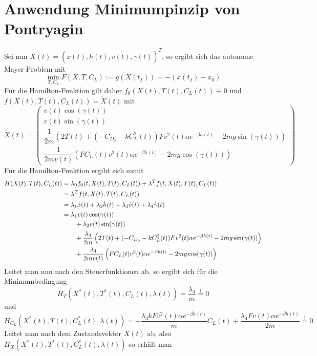 \section{Anwendung Minimumpinzip von Pontryagin}
Sei nun $\dot{X}(t) = (\dot{x}(t), \dot{h}(t),\dot{v}(t),\dot{\gamma}(t))^T$, so ergibt sich das autonome Mayer-Problem mit \[\min_{T,C_L} F(X,T,C_L) := g(X(t_f)) =  -(x(t_f) - x_0)\] Für die Hamilton-Funktion gilt daher $f_0(X(t),T(t),C_L(t)) \equiv 0$ und $f(X(t),T(t),C_L(t)) = \dot{X}(t)$ mit
\[\dot{X}(t) = \begin{pmatrix}
v(t) \cos(\gamma(t)) \\ 
v(t) \sin(\gamma(t)) \\ 
\dfrac{1}{2m} \left(2T(t) + (-C_{D_0}-k C_L^2(t)) F  v^2(t) \alpha e^{-\beta h(t)} - 2 m g \sin(\gamma(t)) \right) \\ 
\dfrac{1}{2mv(t)} \left(F C_L(t)v^2(t) \alpha e^{-\beta h(t)} - 2 m g \cos(\gamma(t)) \right)
\end{pmatrix} \]
Für die Hamilton-Funktion ergibt sich somit 
\[\begin{split}
H(X(t),T(t),C_L(t)) &= \lambda_0 f_0(t,X(t),T(t),C_L(t)) + \lambda^T f(t,X(t),T(t),C_L(t)) \\\
&= \lambda^T f(t,X(t),T(t),C_L(t)) \\\
&= \lambda_1 \dot{x}(t) + \lambda_2 \dot{h}(t) + \lambda_3 \dot{v}(t) + \lambda_4 \dot{\gamma}(t) \\\
&= \lambda_1 v(t) \cos(\gamma(t)) \\\
&\hspace{7mm} + \lambda_2 v(t) \sin(\gamma(t)) \\\
&\hspace{7mm} + \dfrac{\lambda_3}{2m} \left(2T(t) + (-C_{D_0}-k C_L^2(t)) F  v^2(t) \alpha e^{-\beta h(t)} - 2 m g \sin(\gamma(t)) \right) \\\
&\hspace{7mm} + \dfrac{\lambda_4}{2mv(t)} \left(F C_L(t)v^2(t) \alpha e^{-\beta h(t)} - 2 m g \cos(\gamma(t)) \right) 
\end{split}\]
Leitet man nun nach den Steuerfunktionen ab, so ergibt sich für die Minimumbedingung
\[H_{T}(X^{\ast}(t),T^{\ast}(t),C_L(t),\lambda(t)) = \dfrac{\lambda_3}{m} \stackrel{!}{=} 0\]
und 
\[H_{C_L}(X^{\ast}(t),T(t),C_L^{\ast}(t),\lambda(t)) = - \dfrac{\lambda_3 k F v^2(t) \alpha e^{-\beta h(t)}}{m} C_L(t)  + \dfrac{\lambda_4 F v(t) \alpha e^{-\beta h(t)}}{2m} \stackrel{!}{=} 0 \]
Leitet man nach dem Zustandsvektor $X(t)$ ab, also $H_{X}(X^{\ast}(t),T^{\ast}(t),C_L^{\ast}(t),\lambda(t))$ so erhält man 
